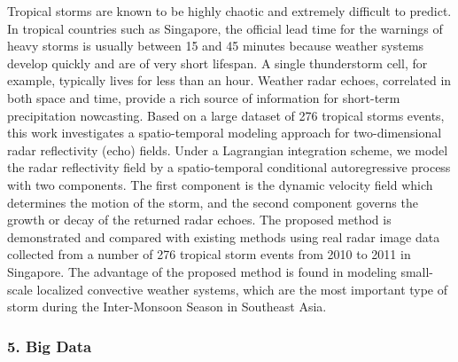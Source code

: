 \begin{itemize}
Tropical storms are known to be highly chaotic and extremely difficult to predict. In tropical countries such as Singapore, the official lead time for the warnings of heavy storms is usually between 15 and 45 minutes because weather systems develop quickly and are of very short lifespan. A single thunderstorm cell, for example, typically lives for less than an hour. Weather radar echoes, correlated in both space and time, provide a rich source of information for short-term precipitation nowcasting. Based on a large dataset of 276 tropical storms events, this work investigates a spatio-temporal modeling approach for two-dimensional radar reflectivity (echo) fields. Under a Lagrangian integration scheme, we model the radar reflectivity field by a spatio-temporal conditional autoregressive process with two components. The first component is the dynamic velocity field which determines the motion of the storm, and the second component governs the growth or decay of the returned radar echoes. The proposed method is demonstrated and compared with existing methods using real radar image data collected from a number of 276 tropical storm events from 2010 to 2011 in Singapore. The advantage of the proposed method is found in modeling small-scale localized convective weather systems, which are the most important type of storm during the Inter-Monsoon Season in Southeast Asia.

\end{itemize}

\subsubsection*{5. Big Data}


